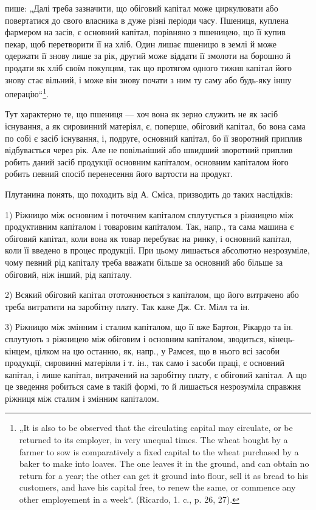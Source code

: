 \parcont{}  %
пише: „Далі треба зазначити, що обіговий капітал може циркулювати
або повертатися до свого власника в дуже різні періоди часу. Пшениця,
куплена фармером на засів, є основний капітал, порівняно з пшеницею,
що її купив пекар, щоб перетворити її на хліб. Один лишає пшеницю
в землі й може одержати її знову лише за рік, другий може віддати її
змолоти на борошно й продати як хліб своїм покупцям, так що протягом
одного тижня капітал його знову стає вільний, і може він знову почати
з ним ту саму або будь-яку іншу операцію“\footnote{
„It is also to be observed that the circulating capital may circulate, or be
returned to its employer, in very unequal times. The wheat bought by a farmer to
sow is comparatively a fixed capital to the wheat purchased by a baker to make
into loaves. The one leaves it in the ground, and can obtain no return for a year; the
other can get it ground into flour, sell it as bread to his customers, and have his capital
free, to renew the same, or commence any other employement in a week“. (Ricardo,
1. c., p. 26, 27).
}.

Тут характерно те, що пшениця — хоч вона як зерно служить не як
засіб існування, а як сировинний матеріял, є, поперше, обіговий капітал,
бо вона сама по собі є засіб існування, і, подруге, основний капітал, бо
її зворотний приплив відбувається через рік. Але не повільніший або
швидший зворотний приплив робить даний засіб продукції основним капіталом,
основним капіталом його робить певний спосіб перенесення його
вартости на продукт.

Плутанина понять, що походить від А. Сміса, призводить до таких
наслідків:

1) Ріжницю між основним і поточним капіталом сплутується з ріжницею
між продуктивним капіталом і товаровим капіталом. Так, напр.,
та сама машина є обіговий капітал, коли вона як товар перебуває на
ринку, і основний капітал, коли її введено в процес продукції. При
цьому лишається абсолютно незрозуміле, чому певний рід капіталу треба
вважати більше за основний або більше за обіговий, ніж інший, рід капіталу.

2) Всякий обіговий капітал ототожнюється з капіталом, що його витрачено
або треба витратити на заробітну плату. Так каже Дж. Ст. Мілл та ін.

3) Ріжницю між змінним і сталим капіталом, що її вже Бартон, Рікардо
та ін. сплутують з ріжницею між обіговим і основним капіталом, зводиться,
кінець-кінцем, цілком на цю останню, як, напр., у Рамсея, що в нього
всі засоби продукції, сировинні матеріяли і т. ін., так само і засоби праці,
є основний капітал, і лише капітал, витрачений на заробітну плату, є
обіговий капітал. А що це зведення робиться саме в такій формі, то й
лишається незрозуміла справжня ріжниця між сталим і змінним капіталом.

